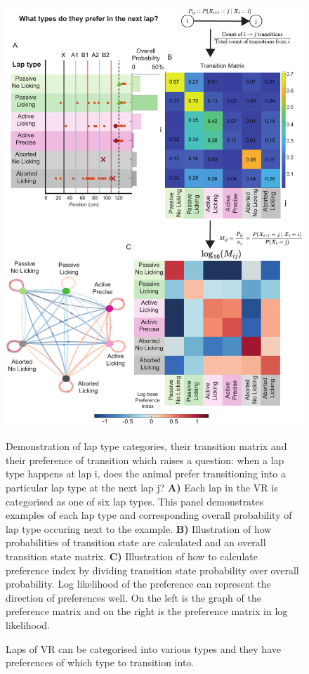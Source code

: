 \begin{figure}
    \centering
    \includegraphics[width=1\linewidth]{figures//Chapter 3 Behaviour//Thesis Figures//figure_PDFs/fig4_transition_matrix.pdf}
    \caption{Laps of VR can be categorised into various types and they have preferences of which type to transition into.}

\medskip
\small
Demonstration of lap type categories, their transition matrix and their preference of transition which raises a question: when a lap type happens at lap i, does the animal prefer transitioning into a particular lap type at the next lap j? \textbf{A)} Each lap in the VR is categorised as one of six lap types. This panel demonstrates examples of each lap type and corresponding overall probability of lap type occuring next to the example. \textbf{B)} Illustration of how probabilities of transition state are calculated and an overall transition state matrix. \textbf{C)} Illustration of how to calculate preference index by dividing transition state probability over overall probability. Log likelihood of the preference can represent the direction of preferences well. On the left is the graph of the preference matrix and on the right is the preference matrix in log likelihood. 
    \label{fig:how to preference matrix}
\end{figure}







